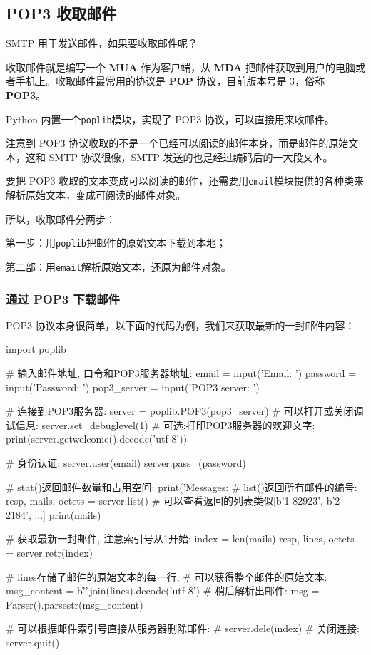 \hypertarget{pop3-ux6536ux53d6ux90aeux4ef6}{%
\subsection{POP3 收取邮件}\label{pop3-ux6536ux53d6ux90aeux4ef6}}

SMTP 用于发送邮件，如果要收取邮件呢？

收取邮件就是编写一个 \textbf{MUA} 作为客户端，从 \textbf{MDA}
把邮件获取到用户的电脑或者手机上。收取邮件最常用的协议是 \textbf{POP}
协议，目前版本号是 3，俗称 \textbf{POP3}。

Python 内置一个\texttt{poplib}模块，实现了 POP3
协议，可以直接用来收邮件。

注意到 POP3
协议收取的不是一个已经可以阅读的邮件本身，而是邮件的原始文本，这和 SMTP
协议很像，SMTP 发送的也是经过编码后的一大段文本。

要把 POP3
收取的文本变成可以阅读的邮件，还需要用\texttt{email}模块提供的各种类来解析原始文本，变成可阅读的邮件对象。

所以，收取邮件分两步：

第一步：用\texttt{poplib}把邮件的原始文本下载到本地；

第二部：用\texttt{email}解析原始文本，还原为邮件对象。

\hypertarget{ux901aux8fc7-pop3-ux4e0bux8f7dux90aeux4ef6}{%
\subsubsection{通过 POP3
下载邮件}\label{ux901aux8fc7-pop3-ux4e0bux8f7dux90aeux4ef6}}

POP3 协议本身很简单，以下面的代码为例，我们来获取最新的一封邮件内容：

\begin{pythoncode}
import poplib

# 输入邮件地址, 口令和POP3服务器地址:
email = input('Email: ')
password = input('Password: ')
pop3_server = input('POP3 server: ')

# 连接到POP3服务器:
server = poplib.POP3(pop3_server)
# 可以打开或关闭调试信息:
server.set_debuglevel(1)
# 可选:打印POP3服务器的欢迎文字:
print(server.getwelcome().decode('utf-8'))

# 身份认证:
server.user(email)
server.pass_(password)

# stat()返回邮件数量和占用空间:
print('Messages: %
# list()返回所有邮件的编号:
resp, mails, octets = server.list()
# 可以查看返回的列表类似[b'1 82923', b'2 2184', ...]
print(mails)

# 获取最新一封邮件, 注意索引号从1开始:
index = len(mails)
resp, lines, octets = server.retr(index)

# lines存储了邮件的原始文本的每一行,
# 可以获得整个邮件的原始文本:
msg_content = b'\r\n'.join(lines).decode('utf-8')
# 稍后解析出邮件:
msg = Parser().parsestr(msg_content)

# 可以根据邮件索引号直接从服务器删除邮件:
# server.dele(index)
# 关闭连接:
server.quit()
\end{pythoncode}

